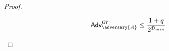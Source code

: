 \begin{proof}
\begin{itemize}
\begin{align*}
    \advtg_\adversary{A}^{\mathsf{G7}} \le \frac{1+q}{2^{\mathcal{D}_{min}}}\\
\end{align*}
    

\end{itemize}
\end{proof}
